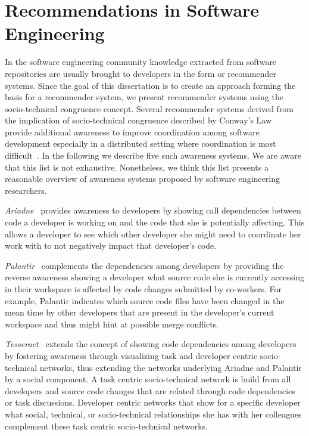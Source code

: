 \section{Recommendations in Software Engineering}
In the software engineering community knowledge extracted from software repositories are usually brought to developers in the form or recommender systems.
Since the goal of this dissertation is to create an approach forming the basis for a recommender system, we present recommender systems using the socio-technical congruence concept.
Several recommender systems derived from the implication of socio-technical congruence described by Conway's Law~\cite{conway:datamination:1968} provide additional awareness to improve coordination among software development especially in a distributed setting where coordination is most difficult~\cite{olson:hci:2000}.
In the following we describe five such awareness systems.
We are aware that this list is not exhaustive. 
Nonetheless, we think this list presents a reasonable overview of awareness systems proposed by software engineering researchers.

\emph{Ariadne}~\cite{trainer2005:ariadne} provides awareness to developers by showing call dependencies between code a developer is working on and the code that she is potentially affecting.
This allows a developer to see which other developer she might need to coordinate her work with to not negatively impact that developer's code.

\emph{Palantir}~\cite{sarma:cscw:2002} complements the dependencies among developers by providing the reverse awareness  showing a developer what source code she is currently accessing in their workspace is affected by code changes submitted by co-workers.
For example, Palantir indicates which source code files have been changed in the mean time by other developers that are present in the developer's current workspace and thus might hint at possible merge conflicts.

\emph{Tesseract}~\cite{sarma:icse:2009} extends the concept of showing code dependencies among developers by fostering awareness through visualizing task and developer centric socio-technical networks, thus extending the networks underlying Ariadne and Palantir by a social component.
A task centric socio-technical network is build from all developers and source code changes that are related through code dependencies or task discussions.
Developer centric networks that show for a specific developer what social, technical, or socio-technical relationships she has with her colleagues complement these task centric socio-technical networks.

